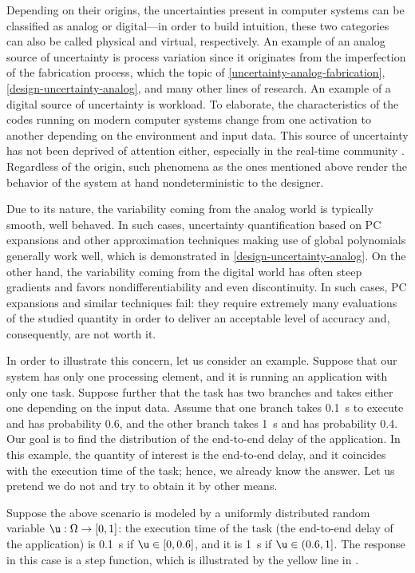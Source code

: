 Depending on their origins, the uncertainties present in computer systems can be
classified as analog or digital---in order to build intuition, these two
categories can also be called physical and virtual, respectively. An example of
an analog source of uncertainty is process variation since it originates from
the imperfection of the fabrication process, which the topic of
\cref{uncertainty-analog-fabrication}, \cref{design-uncertainty-analog}, and
many other lines of research. An example of a digital source of uncertainty is
workload. To elaborate, the characteristics of the codes running on modern
computer systems change from one activation to another depending on the
environment and input data. This source of uncertainty has not been deprived of
attention either, especially in the real-time community \cite{quinton2012,
diaz2002, santinelli2011, tanasa2015}. Regardless of the origin, such phenomena
as the ones mentioned above render the behavior of the system at hand
nondeterministic to the designer.

Due to its nature, the variability coming from the analog world is typically
smooth, well behaved. In such cases, uncertainty quantification based on
\acf{PC} expansions \cite{xiu2010} and other approximation techniques making use
of global polynomials generally work well, which is demonstrated in
\cref{design-uncertainty-analog}. On the other hand, the variability coming from
the digital world has often steep gradients and favors nondifferentiability and
even discontinuity. In such cases, \ac{PC} expansions and similar techniques
fail: they require extremely many evaluations of the studied quantity in order
to deliver an acceptable level of accuracy and, consequently, are not worth it.

In order to illustrate this concern, let us consider an example. Suppose that
our system has only one processing element, and it is running an application
with only one task. Suppose further that the task has two branches and takes
either one depending on the input data. Assume that one branch takes 0.1~s to
execute and has probability 0.6, and the other branch takes 1~s and has
probability 0.4. Our goal is to find the distribution of the end-to-end delay of
the application. In this example, the quantity of interest is the end-to-end
delay, and it coincides with the execution time of the task; hence, we already
know the answer. Let us pretend we do not and try to obtain it by other means.

Suppose the above scenario is modeled by a uniformly distributed random variable
$\u: \Omega \to [0, 1]$: the execution time of the task (the end-to-end delay of
the application) is 0.1~s if $\u \in [0, 0.6]$, and it is 1~s if $\u \in (0.6,
1]$. The response in this case is a step function, which is illustrated by the
yellow line in .

